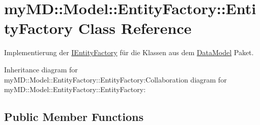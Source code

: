 \hypertarget{classmy_m_d_1_1_model_1_1_entity_factory_1_1_entity_factory}{
\section{my\-MD::Model::Entity\-Factory::Entity\-Factory Class Reference}
\label{dd/d55/classmy_m_d_1_1_model_1_1_entity_factory_1_1_entity_factory}
}
Implementierung der \hyperlink{interfacemy_m_d_1_1_model_1_1_entity_factory_1_1_i_entity_factory}{IEntity\-Factory} f\"{u}r die Klassen aus dem \hyperlink{namespacemy_m_d_1_1_model_1_1_data_model}{Data\-Model} Paket.  


Inheritance diagram for my\-MD::Model::Entity\-Factory::Entity\-Factory:Collaboration diagram for my\-MD::Model::Entity\-Factory::Entity\-Factory:\subsection*{Public Member Functions}
